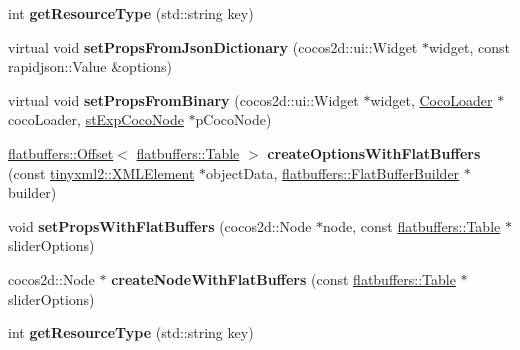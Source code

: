 \begin{DoxyCompactItemize}
int {\bfseries get\+Resource\+Type} (std\+::string key)
\item 
\mbox{\label{classcocostudio_1_1SliderReader_a5549b8912090b578335df38fa45eb3c9}} 
virtual void {\bfseries set\+Props\+From\+Json\+Dictionary} (cocos2d\+::ui\+::\+Widget $\ast$widget, const rapidjson\+::\+Value \&options)
\item 
\mbox{\label{classcocostudio_1_1SliderReader_a01e1b760f4d9abe16b92b31820f5a488}} 
virtual void {\bfseries set\+Props\+From\+Binary} (cocos2d\+::ui\+::\+Widget $\ast$widget, \hyperlink{classcocostudio_1_1CocoLoader}{Coco\+Loader} $\ast$coco\+Loader, \hyperlink{structcocostudio_1_1stExpCocoNode}{st\+Exp\+Coco\+Node} $\ast$p\+Coco\+Node)
\item 
\mbox{\label{classcocostudio_1_1SliderReader_af206028f272eff49b3b60da32b8d1bcc}} 
\hyperlink{structflatbuffers_1_1Offset}{flatbuffers\+::\+Offset}$<$ \hyperlink{classflatbuffers_1_1Table}{flatbuffers\+::\+Table} $>$ {\bfseries create\+Options\+With\+Flat\+Buffers} (const \hyperlink{classtinyxml2_1_1XMLElement}{tinyxml2\+::\+X\+M\+L\+Element} $\ast$object\+Data, \hyperlink{classflatbuffers_1_1FlatBufferBuilder}{flatbuffers\+::\+Flat\+Buffer\+Builder} $\ast$builder)
\item 
\mbox{\label{classcocostudio_1_1SliderReader_ac300a0f09a00bb4f77d6931bc1a11736}} 
void {\bfseries set\+Props\+With\+Flat\+Buffers} (cocos2d\+::\+Node $\ast$node, const \hyperlink{classflatbuffers_1_1Table}{flatbuffers\+::\+Table} $\ast$slider\+Options)
\item 
\mbox{\label{classcocostudio_1_1SliderReader_ab5420b2fe66a65ea4fbc6b02443133e9}} 
cocos2d\+::\+Node $\ast$ {\bfseries create\+Node\+With\+Flat\+Buffers} (const \hyperlink{classflatbuffers_1_1Table}{flatbuffers\+::\+Table} $\ast$slider\+Options)
\item 
\mbox{\label{classcocostudio_1_1SliderReader_aa066411b005860be04bc429a5a8898bf}} 
int {\bfseries get\+Resource\+Type} (std\+::string key)
\end{DoxyCompactItemize}

